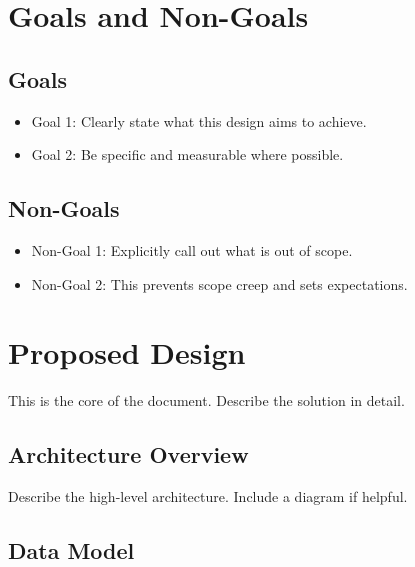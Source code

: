 \documentclass[11pt, a4paper]{article}
\begin{document}
\section{Goals and Non-Goals}

\subsection*{Goals}
\begin{itemize}
    \item Goal 1: Clearly state what this design aims to achieve.
    \item Goal 2: Be specific and measurable where possible.
\end{itemize}

\subsection*{Non-Goals}
\begin{itemize}
    \item Non-Goal 1: Explicitly call out what is out of scope.
    \item Non-Goal 2: This prevents scope creep and sets expectations.
\end{itemize}

\section{Proposed Design}

This is the core of the document. Describe the solution in detail.

\subsection{Architecture Overview}

Describe the high-level architecture. Include a diagram if helpful.


\subsection{Data Model}
\end{document}

